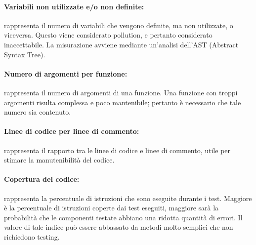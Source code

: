 \paragraph{Variabili non utilizzate e/o non definite:} rappresenta il numero di variabili che vengono definite, ma non utilizzate, o viceversa. Questo viene considerato pollution, e pertanto considerato inaccettabile. La misurazione avviene mediante un’analisi dell’AST (Abstract Syntax Tree).

\paragraph{Numero di argomenti per funzione:} rappresenta il numero di argomenti di una funzione. Una funzione con troppi argomenti risulta complessa e poco mantenibile; pertanto è necessario che tale numero sia contenuto.

\paragraph{Linee di codice per linee di commento:} rappresenta il rapporto tra le linee di codice e linee di commento, utile per stimare la manutenibilità del codice.

\paragraph{Copertura del codice:} rappresenta la percentuale di istruzioni che sono eseguite durante i test. Maggiore è la percentuale di istruzioni coperte dai test eseguiti, maggiore sarà la probabilità
che le componenti testate abbiano una ridotta quantità di errori. Il valore di tale indice può essere abbassato da metodi molto semplici che non richiedono testing.
